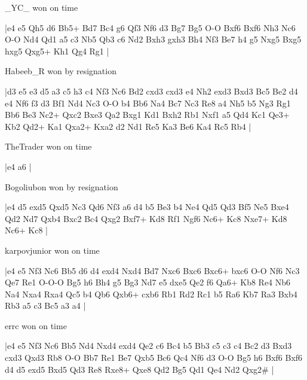 \showboard

\_YC\_ won on time

\makegametitle
|e4 e5 Qh5 d6 Bb5+ Bd7 Bc4 g6 Qf3 Nf6 d3 Bg7 Bg5 O-O Bxf6 Bxf6 Nh3 Nc6 O-O Nd4 Qd1 a5 c3 Nb5 Qb3 c6 Nd2 Bxh3 gxh3 Bh4 Nf3 Be7 h4 g5 Nxg5 Bxg5 hxg5 Qxg5+ Kh1 Qg4 Rg1  |

\showboard

Habeeb\_R won by resignation

\makegametitle
|d3 e5 e3 d5 a3 c5 h3 c4 Nf3 Nc6 Bd2 cxd3 cxd3 e4 Nh2 exd3 Bxd3 Bc5 Be2 d4 e4 Nf6 f3 d3 Bf1 Nd4 Nc3 O-O b4 Bb6 Na4 Bc7 Nc3 Re8 a4 Nh5 b5 Ng3 Rg1 Bb6 Be3 Nc2+ Qxc2 Bxe3 Qa2 Bxg1 Kd1 Bxh2 Rb1 Nxf1 a5 Qd4 Kc1 Qe3+ Kb2 Qd2+ Ka1 Qxa2+ Kxa2 d2 Nd1 Re5 Ka3 Be6 Ka4 Rc5 Rb4  |

\showboard

TheTrader won on time

\makegametitle
|e4 a6  |

\showboard

Bogoliubon won by resignation

\makegametitle
|e4 d5 exd5 Qxd5 Nc3 Qd6 Nf3 a6 d4 b5 Be3 b4 Ne4 Qd5 Qd3 Bf5 Ne5 Bxe4 Qd2 Nd7 Qxb4 Bxc2 Bc4 Qxg2 Bxf7+ Kd8 Rf1 Ngf6 Nc6+ Kc8 Nxe7+ Kd8 Nc6+ Kc8  |

\showboard

karpovjunior won on time

\makegametitle
|e4 e5 Nf3 Nc6 Bb5 d6 d4 exd4 Nxd4 Bd7 Nxc6 Bxc6 Bxc6+ bxc6 O-O Nf6 Nc3 Qe7 Re1 O-O-O Bg5 h6 Bh4 g5 Bg3 Nd7 e5 dxe5 Qe2 f6 Qa6+ Kb8 Re4 Nb6 Na4 Nxa4 Rxa4 Qc5 b4 Qb6 Qxb6+ cxb6 Rb1 Rd2 Rc1 b5 Ra6 Kb7 Ra3 Bxb4 Rb3 a5 c3 Bc5 a3 a4  |

\showboard

errc won on time

\makegametitle
|e4 e5 Nf3 Nc6 Bb5 Nd4 Nxd4 exd4 Qe2 c6 Bc4 b5 Bb3 c5 c3 c4 Bc2 d3 Bxd3 cxd3 Qxd3 Rb8 O-O Bb7 Re1 Be7 Qxb5 Bc6 Qc4 Nf6 d3 O-O Bg5 h6 Bxf6 Bxf6 d4 d5 exd5 Bxd5 Qd3 Re8 Rxe8+ Qxe8 Qd2 Bg5 Qd1 Qe4 Nd2 Qxg2\#  |

\showboard

